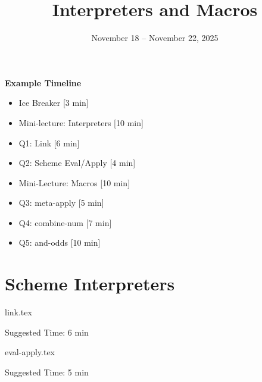 \documentclass{exam}
\title{Interpreters and Macros}
\date{November 18 -- November 22, 2025}
\begin{document}
\maketitle

\begin{meta}
    \textbf{Example Timeline}
    \begin{itemize}
        \item Ice Breaker [3 min]
        \item Mini-lecture: Interpreters [10 min]
        \item Q1: Link [6 min]
        \item Q2: Scheme Eval/Apply [4 min]
        \item Mini-Lecture: Macros [10 min]
        \item Q3: meta-apply [5 min]
        \item Q4: combine-num [7 min]
        \item Q5: and-odds [10 min]
    \end{itemize}

\end{meta}

\section{Scheme Interpreters}
\begin{questions}
    {link.tex}
    \begin{questionmeta}
        Suggested Time: 6 min
    \end{questionmeta}

    {eval-apply.tex}
    \begin{questionmeta}
        Suggested Time: 5 min
    \end{questionmeta}

\end{questions}
\end{document}
